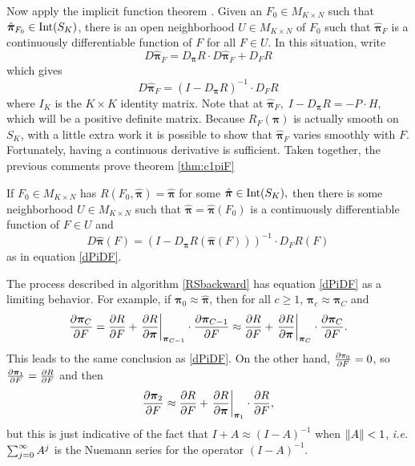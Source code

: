 Now apply the implicit function theorem \cite[theorem 3.2.4]{krantz2012implicit}. Given an \( F_0\in M_{K\times N} \) such that \( \hat{\bm \pi}_{F_0}\in\operatorname{Int}(S_K) \), there is an open neighborhood \( U\in M_{K\times N} \) of \( F_0 \) such that \( \hat{\bm \pi}_F \) is a continuously differentiable function of \( F \) for all \( F\in U \).  In this situation, write
\[D\hat{\bm\pi}_F=D_{\bm\pi}R\cdot D\hat{\bm\pi}_F+D_FR\]
which gives 
\begin{equation}\label{dPiDF}
D\hat{\bm\pi}_F=\left(I-D_{\bm\pi}R\right)^{-1}\cdot D_{F}R
\end{equation}
where \( I_K \) is the \( K\times K \) identity matrix. Note that at \( \hat{\bm \pi}_F,\;  I-D_{\bm\pi}R = -P\cdot H\), which will be a positive definite matrix. Because \( R_F(\bm\pi) \) is actually smooth on \( S_K \), with a little extra work it is possible to show that \( \hat{\bm \pi}_F \) varies smoothly with \( F \).  Fortunately, having a continuous derivative is sufficient. Taken together, the previous comments prove theorem \ref{thm:c1piF}

\begin{thm}\label{thm:c1piF}
	If \( F_0 \in M_{K\times N} \) has \( R(F_0,\hat{\bm \pi}) = \hat{\bm \pi} \) for some \( \hat{\bm \pi}\in\operatorname{Int}(S_K), \) then there is some neighborhood \( U\in M_{K\times N} \) such that \( \hat{\bm \pi} = \hat{\bm \pi}(F_0) \) is a continuously differentiable function of \( F\in U \)  and
	\[D\hat{\bm\pi}(F)=\left(I-D_{\bm\pi}R(\hat{\bm \pi}(F))\right)^{-1}\cdot D_{F}R(F)\]
	as in equation \eqref{dPiDF}.
\end{thm}


The process described in algorithm \ref{RSbackward} has equation \ref{dPiDF} as a limiting behavior.  For example, if \( \bm\pi_0\approx \hat{\bm\pi} \), then for all \( c\geq 1 \), \( \bm\pi_c\approx\bm\pi_C \) and 
\[  \pdv{\bm\pi_C}{F} = \pdv{R}{F} + \eval{\pdv{R}{\bm\pi}}_{\bm\pi_{C-1}}\cdot\pdv{\bm\pi_{C-1}}{F}\approx \pdv{R}{F} + \eval{\pdv{R}{\bm\pi}}_{\bm\pi_{C}}\cdot\pdv{\bm\pi_{C}}{F}. \]
This leads to the same conclusion as \ref{dPiDF}. 
On the other hand, \( \pdv{\pi_0}{F} = 0\), so \( \pdv{\bm\pi_1}{F} = \pdv{R}{F}\) and then
\[\pdv{\bm\pi_2}{F}\approx \pdv{R}{F}+\eval{\pdv{R}{\bm\pi}}_{\bm\pi_1}\cdot\pdv{R}{F},\]
but this is just indicative of the fact that \(I+A\approx (I-A)^{-1}\) when \(\norm{A}<1\), \textit{i.e.} \( \sum_{j=0}^{\infty} A^j \) is the Nuemann series for the operator \( (I-A)^{-1} \).

